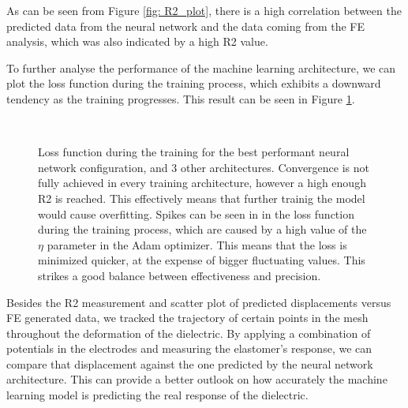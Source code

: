 As can be seen from Figure \ref{fig: R2_plot}, there is a high correlation between the predicted data from the neural network and the data coming from the FE analysis, which was also indicated by a high R2 value.

To further analyse the performance of the machine learning architecture, we can plot the loss function during the training process, which exhibits a downward tendency as the training progresses. This result can be seen in Figure \ref{fig: losses}. 


\begin{figure}
  \begin{center}
     \qquad
     \\
     \qquad
  \end{center}
  \caption{Loss function during the training for the best performant neural network configuration, and 3 other architectures. Convergence is not fully achieved in every training architecture, however a high enough R2 is reached. This effectively means that further trainig the model would cause overfitting. Spikes can be seen in in the loss function during the training process, which are caused by a high value of the $\eta$ parameter in the Adam optimizer. This means that the loss is minimized quicker, at the expense of bigger fluctuating values. This strikes a good balance between effectiveness and precision.}
  \label{fig: losses}
\end{figure}


Besides the R2 measurement and scatter plot of predicted displacements versus FE generated data, we tracked the trajectory of certain points in the mesh throughout the deformation of the dielectric. By applying a combination of potentials in the electrodes and measuring the elastomer's response, we can compare that displacement against the one predicted by the neural network architecture. This can provide a better outlook on how accurately the machine learning model is predicting the real response of the dielectric. 


